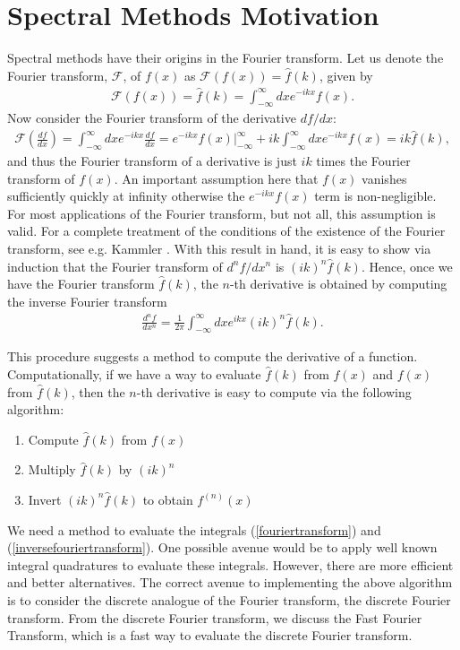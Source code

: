 \section{Spectral Methods Motivation}
Spectral methods have their origins in the Fourier transform. Let us denote the Fourier transform, $\mathcal{F}$, of $f(x)$ as $\mathcal{F}(f(x)) = \hat{f}(k)$, given by
\begin{align}
\mathcal{F}(f(x)) = \hat{f}(k) = \int_{-\infty}^{\infty}dxe^{-ikx}f(x)\label{fouriertransform}.
\end{align}
Now consider the Fourier transform of the derivative $df/dx$: 
\begin{align} 
\mathcal{F}\left(\frac{df}{dx}\right)= \int_{-\infty}^{\infty}dxe^{-ikx}\frac{df}{dx}=e^{-ikx}f(x)\bigg|_{-\infty}^{\infty} + ik\int_{-\infty}^{\infty}dxe^{-ikx}f(x)= ik\hat{f}(k),
\end{align}
and thus the Fourier transform of a derivative is just $ik$ times the Fourier transform of $f(x)$. An important assumption here that $f(x)$ vanishes sufficiently quickly at infinity otherwise the $e^{-ikx}f(x)$ term is non-negligible. For most applications of the Fourier transform, but not all, this assumption is valid. For a complete treatment of the conditions of the existence of the Fourier transform, see e.g. Kammler \cite{kammler}. With this result in hand, it is easy to show via induction that the Fourier transform of $d^{n}f/dx^{n}$ is $(ik)^{n}\hat{f}(k)$. Hence, once we have the Fourier transform $\hat{f}(k)$, the $n$-th derivative is obtained by computing the inverse Fourier transform
\begin{align}
\frac{d^{n}f}{dx^{n}} = \frac{1}{2\pi} \int_{-\infty}^{\infty}dx e^{ikx}(ik)^{n}\hat{f}(k).\label{inversefouriertransform}
\end{align}

This procedure suggests a method to compute the derivative of a function. Computationally, if we have a way to evaluate $\hat{f}(k)$ from $f(x)$ and $f(x)$ from $\hat{f}(k)$, then the $n$-th derivative is easy to compute via the following algorithm:  
\begin{enumerate} 
\item Compute $\hat{f}(k)$ from $f(x)$
\item Multiply $\hat{f}(k)$ by $(ik)^{n}$ 
\item Invert $(ik)^{n}\hat{f}(k)$ to obtain $f^{(n)}(x)$
\end{enumerate}

We need a method to evaluate the integrals (\ref{fouriertransform}) and (\ref{inversefouriertransform}). One possible avenue would be to apply well known integral quadratures to evaluate these integrals. However, there are more efficient and better alternatives. The correct avenue to implementing the above algorithm is to consider the discrete analogue of the Fourier transform, the discrete Fourier transform. From the discrete Fourier transform, we discuss the Fast Fourier Transform, which is a fast way to evaluate the discrete Fourier transform.
